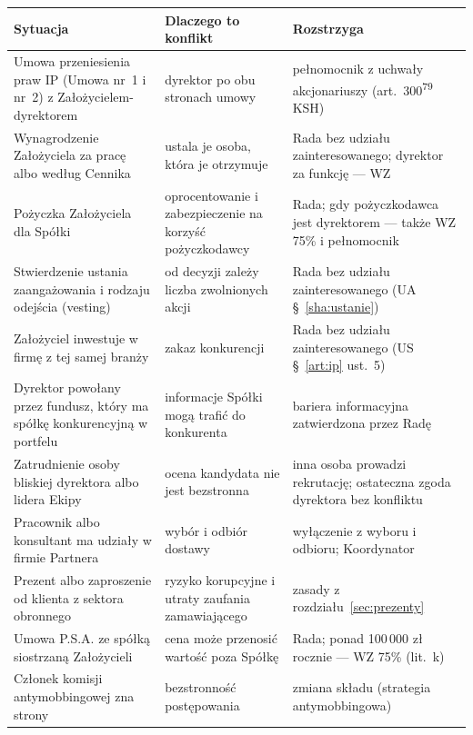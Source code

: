 \documentclass[11pt,a4paper]{report}
\newcommand{\US}[1]{US §~#1}
\newcommand{\UA}[1]{UA §~#1}
\begin{document}
\begin{center}
\small
\begin{tabularx}{\linewidth}{@{}>{\raggedright\arraybackslash}p{3.8cm} X >{\raggedright\arraybackslash}p{3.6cm}@{}}
\toprule
\textbf{Sytuacja} & \textbf{Dlaczego to konflikt} & \textbf{Rozstrzyga} \\
\midrule
Umowa przeniesienia praw IP (Umowa nr~1 i nr~2) z Założycielem-dyrektorem & dyrektor po obu stronach umowy & pełnomocnik z uchwały akcjonariuszy (art.~300\textsuperscript{79} KSH) \\
Wynagrodzenie Założyciela za pracę albo według Cennika & ustala je osoba, która je otrzymuje & Rada bez udziału zainteresowanego; dyrektor za funkcję --- WZ \\
Pożyczka Założyciela dla Spółki & oprocentowanie i zabezpieczenie na korzyść pożyczkodawcy & Rada; gdy pożyczkodawca jest dyrektorem --- także WZ 75\% i pełnomocnik \\
Stwierdzenie ustania zaangażowania i rodzaju odejścia (vesting) & od decyzji zależy liczba zwolnionych akcji & Rada bez udziału zainteresowanego (\UA{\ref{sha:ustanie}}) \\
Założyciel inwestuje w firmę z tej samej branży & zakaz konkurencji & Rada bez udziału zainteresowanego (\US{\ref{art:ip} ust.~5}) \\
Dyrektor powołany przez fundusz, który ma spółkę konkurencyjną w portfelu & informacje Spółki mogą trafić do konkurenta & bariera informacyjna zatwierdzona przez Radę \\
Zatrudnienie osoby bliskiej dyrektora albo lidera Ekipy & ocena kandydata nie jest bezstronna & inna osoba prowadzi rekrutację; ostateczna zgoda dyrektora bez konfliktu \\
Pracownik albo konsultant ma udziały w firmie Partnera & wybór i odbiór dostawy & wyłączenie z wyboru i odbioru; Koordynator \\
Prezent albo zaproszenie od klienta z sektora obronnego & ryzyko korupcyjne i utraty zaufania zamawiającego & zasady z rozdziału~\ref{sec:prezenty} \\
Umowa P.S.A. ze spółką siostrzaną Założycieli & cena może przenosić wartość poza Spółkę & Rada; ponad 100\,000 zł rocznie --- WZ 75\% (lit.~k) \\
Członek komisji antymobbingowej zna strony & bezstronność postępowania & zmiana składu (strategia antymobbingowa) \\
\bottomrule
\end{tabularx}
\end{center}
\end{document}
